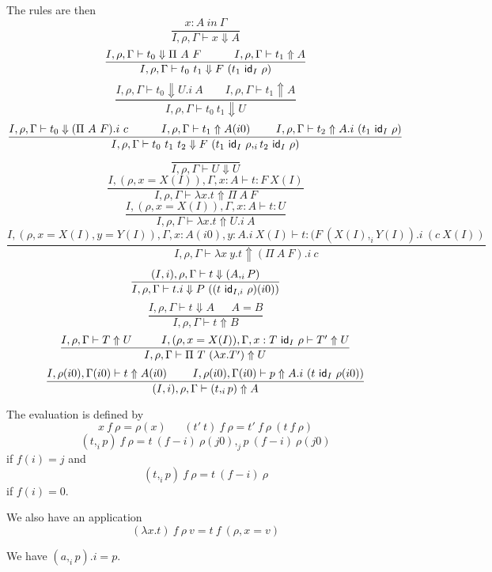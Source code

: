 \documentclass[10pt,a4paper]{article}
\newcommand{\ID}{{\sf id}}
\begin{document}
 The rules are then
$$
\frac{x:A~in~\Gamma}{I,\rho,\Gamma\vdash x\Downarrow A}
$$
$$
\frac{I,\rho,\Gamma\vdash t_0\Downarrow\Pi~A~F~~~~~~~~~I,\rho,\Gamma\vdash t_1\Uparrow A}
     {I,\rho,\Gamma\vdash t_0~t_1\Downarrow F~(t_1~\ID_I~\rho)}
$$
$$
\frac{I,\rho,\Gamma\vdash t_0\Downarrow U.i~A~~~~~~~~~I,\rho,\Gamma\vdash t_1\Uparrow A}
     {I,\rho,\Gamma\vdash t_0~t_1\Downarrow U}
$$
$$
\frac{I,\rho,\Gamma\vdash t_0\Downarrow (\Pi~A~F).i~c~~~~~~~~~
      I,\rho,\Gamma\vdash t_1\Uparrow A(i0)~~~~~~~
      I,\rho,\Gamma\vdash t_2\Uparrow A.i~(t_1~\ID_I~\rho)}
     {I,\rho,\Gamma\vdash t_0~t_1~t_2\Downarrow F~(t_1~\ID_I~\rho,_i t_2~\ID_I~\rho)}
$$
$$
\frac{}{I,\rho,\Gamma\vdash U\Downarrow U}
$$
$$
\frac{I,(\rho,x=X(I)),\Gamma,x:A\vdash t:F~X(I)}{I,\rho,\Gamma\vdash \lambda x.t\Uparrow \Pi~A~F}
$$
$$
\frac{I,(\rho,x=X(I)),\Gamma,x:A\vdash t:U}{I,\rho,\Gamma\vdash \lambda x.t\Uparrow U.i~A}
$$
$$
\frac{I,(\rho,x=X(I),y=Y(I)),\Gamma,x:A(i0),y:A.i~X(I)\vdash t:(F~(X(I),_i Y(I)).i~(c~X(I))}
     {I,\rho,\Gamma\vdash \lambda x~y.t\Uparrow (\Pi~A~F).i~c}
$$
$$
\frac{(I,i),\rho,\Gamma\vdash t\Downarrow (A,_i P)}
     {I,\rho,\Gamma\vdash t.i\Downarrow P~((t~\ID_{I,i}~\rho)(i0))}
$$
$$
\frac{I,\rho,\Gamma\vdash t\Downarrow A~~~~~~~A = B}{I,\rho,\Gamma\vdash t\Uparrow B}
$$
$$
\frac{I,\rho,\Gamma\vdash T\Uparrow U~~~~~~~~I,(\rho,x=X(I)),\Gamma,x:T~\ID_I~\rho\vdash T'\Uparrow U}
     {I,\rho,\Gamma\vdash \Pi~T~(\lambda x.T')\Uparrow U}
$$
$$
\frac{I,\rho(i0),\Gamma(i0)\vdash t\Uparrow A(i0)~~~~~~~I,\rho(i0),\Gamma(i0)\vdash p\Uparrow A.i~(t~\ID_I~\rho(i0))}
     {(I,i),\rho,\Gamma\vdash (t,_i p)\Uparrow A}
$$

 The evaluation is defined by
$$
x~f~\rho = \rho(x)~~~~~~~(t'~t)~f~\rho = t'~f~\rho~(t~f~\rho)
$$
$$
(t,_i p)~f~\rho = t~(f-i)~\rho(j0),_j p~(f-i)~\rho(j0)
$$
if $f(i) = j$ and 
$$
(t,_i p)~f~\rho = t~(f-i)~\rho
$$
if $f(i) = 0$.

 We also have an application
$$
(\lambda x.t)~f~\rho~v = t~f~(\rho,x=v)
$$

 We have $(a,_i p).i = p$.
\end{document}
